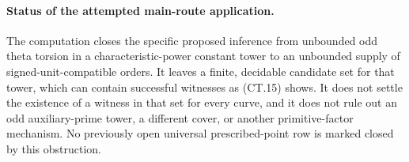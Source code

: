 \paragraph{Status of the attempted main-route application.}
The computation closes the specific proposed inference from
unbounded odd theta torsion in a characteristic-power constant
tower to an unbounded supply of signed-unit-compatible orders.
It leaves a finite, decidable candidate set for that tower,
which can contain successful witnesses as (CT.15) shows.
It does not settle the existence of a witness in that set for
every curve, and it does not rule out an odd auxiliary-prime
tower, a different cover, or another primitive-factor mechanism.
No previously open universal prescribed-point row is marked
closed by this obstruction.
